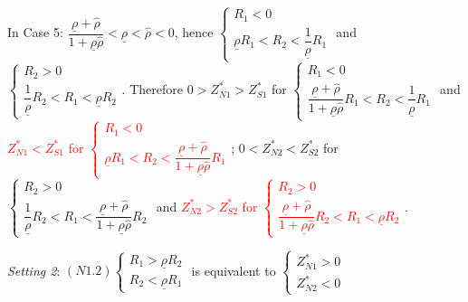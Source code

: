 \documentclass[10pt]{article}
\newcommand{\hhred}{\textcolor{red}}
\begin{document}
In Case 5: $ \dfrac{\underline{\rho} + {\hat \rho}}{1 + \underline{\rho} {\hat \rho}} < \underline{\rho} < {\hat \rho} < 0 $, hence $ \left\{ \begin{matrix} R_1 < 0 \\ \underline{\rho} R_1 < R_2 < \dfrac{1}{\underline{\rho}} R_1 \end{matrix} \right. $ and $ \left\{ \begin{matrix} R_2 > 0 \\ \dfrac{1}{\underline{\rho}} R_2 < R_1 < \underline{\rho} R_2 \end{matrix} \right. $.
Therefore $ 0 > Z_{N 1}^* > Z_{S 1}^* $ for $ \left\{ \begin{matrix} R_1 < 0 \\ \dfrac{\underline{\rho} + {\hat \rho}}{1 + \underline{\rho} {\hat \rho}} R_1 < R_2 < \dfrac{1}{\underline{\rho}} R_1 \end{matrix} \right. $ and \hhred{$ Z_{N 1}^* < Z_{S 1}^* $ for $ \left\{ \begin{matrix} R_1 < 0 \\ \underline{\rho} R_1 < R_2 < \dfrac{\underline{\rho} + {\hat \rho}}{1 + \underline{\rho} {\hat \rho}} R_1 \end{matrix} \right. $}; 
$ 0 < Z_{N 2}^* < Z_{S 2}^* $ for $ \left\{ \begin{matrix} R_2 > 0 \\ \dfrac{1}{\underline{\rho}} R_2 < R_1 < \dfrac{\underline{\rho} + {\hat \rho}}{1 + \underline{\rho} {\hat \rho}} R_2 \end{matrix} \right. $ and \hhred{$ Z_{N 2}^* > Z_{S 2}^* $ for $ \left\{ \begin{matrix} R_2 > 0 \\ \dfrac{\underline{\rho} + {\hat \rho}}{1 + \underline{\rho} {\hat \rho}} R_2 < R_1 < \underline{\rho} R_2 \end{matrix} \right. $}.

{\it Setting 2}: $ (N1.2) \left\{ \begin{matrix} R_1 > \underline{\rho} R_2 \\ R_2 < \underline{\rho} R_1 \end{matrix} \right. $ is equivalent to $ \left\{ \begin{matrix} Z_{N 1}^* > 0 \\ Z_{N 2}^* < 0 \end{matrix} \right. $
\end{document}
